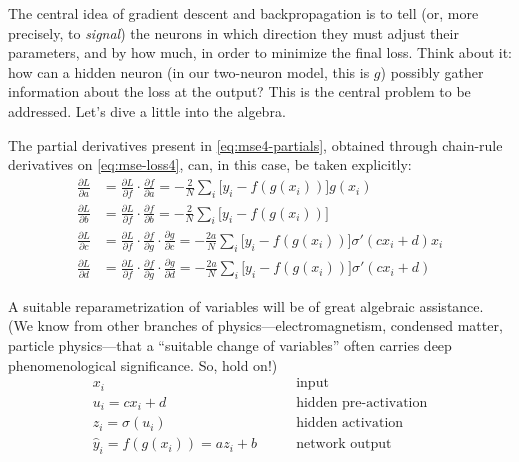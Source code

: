 \documentclass[11pt,a4paper,oneside]{book}
\theoremstyle{definition}
\theoremstyle{plain}
\theoremstyle{remark}
\begin{document}
The central idea of gradient descent and backpropagation is to tell (or, more precisely, to {\it signal}) the neurons in which direction they must adjust their parameters, and by how much, in order to minimize the final loss. Think about it: how can a hidden neuron (in our two-neuron model, this is $g$) possibly gather information about the loss at the output? This is the central problem to be addressed. Let's dive a little into the algebra.

The partial derivatives present in \eqref{eq:mse4-partials}, obtained through chain-rule derivatives on \eqref{eq:mse-loss4}, can, in this case, be taken explicitly:
\begin{equation}
    \label{eq:chain-partials}
    \begin{split}
        \frac{\partial L}{\partial a} &= \frac{\partial L}{\partial f}\cdot\frac{\partial f}{\partial a} = -\frac{2}{N}\sum_i\big[y_i-f(g(x_i))\big]g(x_i)\\
        \frac{\partial L}{\partial b} &= \frac{\partial L}{\partial f}\cdot\frac{\partial f}{\partial b} = -\frac{2}{N}\sum_i\big[y_i-f(g(x_i))\big]\\
        \frac{\partial L}{\partial c} &= \frac{\partial L}{\partial f}\cdot\frac{\partial f}{\partial g}\cdot\frac{\partial g}{\partial c} = -\frac{2a}{N}\sum_i\big[y_i-f(g(x_i))\big]\sigma'(cx_i+d)x_i\\
        \frac{\partial L}{\partial d} &= \frac{\partial L}{\partial f}\cdot\frac{\partial f}{\partial g}\cdot\frac{\partial g}{\partial d} = -\frac{2a}{N}\sum_i\big[y_i-f(g(x_i))\big]\sigma'(cx_i+d)
    \end{split}
\end{equation}

A suitable reparametrization of variables will be of great algebraic assistance. (We know from other branches of physics---electromagnetism, condensed matter, particle physics---that a ``suitable change of variables'' often carries deep phenomenological significance. So, hold on!)
\begin{equation}
    \label{eq:new-variables}
    \begin{split}
        x_i &\qquad\text{input} \\
        u_i = cx_i+d &\qquad\text{hidden pre-activation} \\
        z_i = \sigma(u_i) &\qquad\text{hidden activation} \\
        \hat y_i = f(g(x_i)) = az_i+b &\qquad\text{network output} 
    \end{split}
\end{equation}
\end{document}

